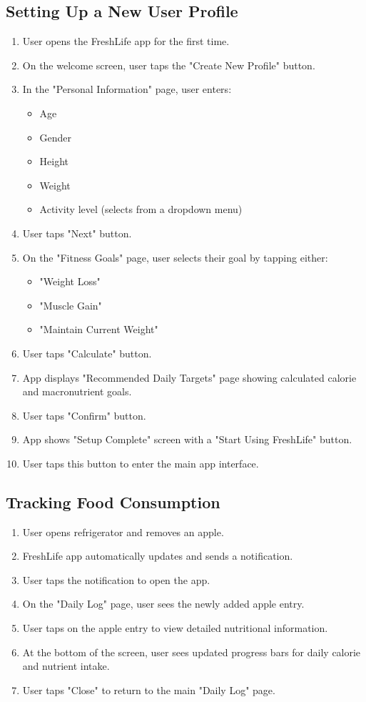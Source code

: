 \documentclass[conference]{IEEEtran}
\begin{document}
\subsection{Setting Up a New User Profile}
\begin{enumerate}
\item User opens the FreshLife app for the first time.
\item On the welcome screen, user taps the "Create New Profile" button.
\item In the "Personal Information" page, user enters:
\begin{itemize}
\item Age
\item Gender
\item Height
\item Weight
\item Activity level (selects from a dropdown menu)
\end{itemize}
\item User taps "Next" button.
\item On the "Fitness Goals" page, user selects their goal by tapping either:
\begin{itemize}
\item "Weight Loss"
\item "Muscle Gain"
\item "Maintain Current Weight"
\end{itemize}
\item User taps "Calculate" button.
\item App displays "Recommended Daily Targets" page showing calculated calorie and macronutrient goals.
\item User taps "Confirm" button.
\item App shows "Setup Complete" screen with a "Start Using FreshLife" button.
\item User taps this button to enter the main app interface.
\end{enumerate}
\subsection{Tracking Food Consumption}
\begin{enumerate}
\item User opens refrigerator and removes an apple.
\item FreshLife app automatically updates and sends a notification.
\item User taps the notification to open the app.
\item On the "Daily Log" page, user sees the newly added apple entry.
\item User taps on the apple entry to view detailed nutritional information.
\item At the bottom of the screen, user sees updated progress bars for daily calorie and nutrient intake.
\item User taps "Close" to return to the main "Daily Log" page.
\end{enumerate}
\end{document}
